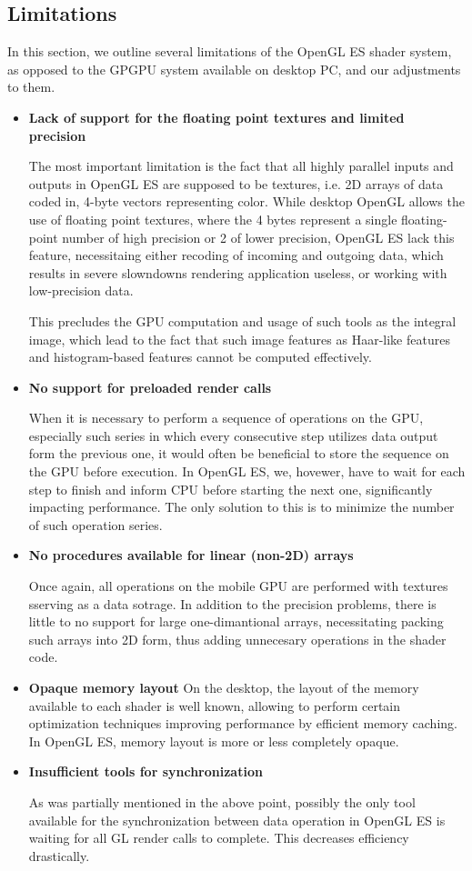 \subsection{Limitations}
In this section, we outline several limitations of the OpenGL ES shader system,  as opposed to the GPGPU system available on desktop PC, and our adjustments to them.
\begin {itemize}
\item {\bf Lack of support for the floating point textures and limited precision}

The most important limitation is the fact that all highly parallel inputs and outputs in OpenGL ES are supposed to be textures, i.e. 2D arrays of data coded in, 4-byte vectors representing color. While desktop OpenGL allows the use of floating point textures, where the 4 bytes represent a single floating-point number of high precision or 2 of lower precision, OpenGL ES lack this feature, necessitaing either recoding of incoming and outgoing data, which results in severe slowndowns rendering application useless, or working with low-precision data.

This precludes the GPU computation and usage of such tools as the integral image, which lead to the fact that such image features as Haar-like features and histogram-based features cannot be computed effectively. 
\item {\bf No support for preloaded render calls}

When it is necessary to perform a sequence of operations on the GPU, especially such series in which every consecutive step utilizes data output form the previous one, it would often be beneficial to store the sequence on the GPU before execution. In OpenGL ES, we, hovewer, have to wait for each step to finish and inform CPU before starting the next one, significantly impacting performance. The only solution to this is to minimize the number of such operation series. 

\item {\bf No procedures available for linear (non-2D) arrays}

Once again, all operations on the mobile GPU are performed with textures sserving as a data sotrage. In addition to the precision problems, there is little to no support for large one-dimantional arrays, necessitating packing such arrays into 2D form, thus adding unnecesary operations in the shader code. 
\item {\bf Opaque memory layout}
On the desktop, the layout of the memory available to each shader is well known, allowing to perform certain optimization techniques improving performance by efficient memory caching. In OpenGL ES, memory layout is more or less completely opaque. 

\item {\bf Insufficient tools for synchronization}

As was partially mentioned in the above point, possibly the only tool available for the synchronization between data operation in OpenGL ES is waiting for all GL render calls to complete. This decreases efficiency drastically. 
\end{itemize}

